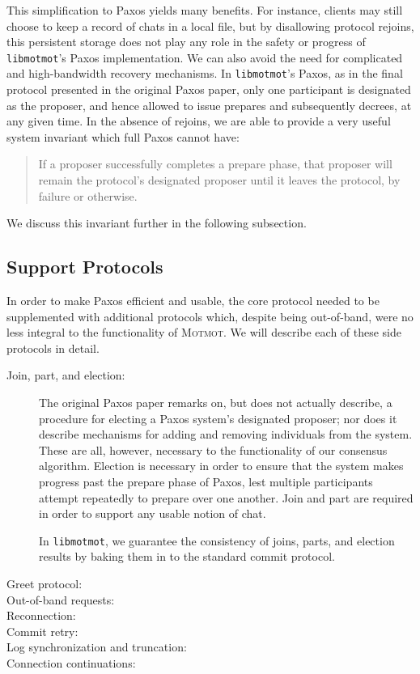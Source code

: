 \documentclass{sig-alternate}
\newcommand\Motmot{\textsc{Motmot}\xspace}
\newcommand\libmotmot{\texttt{libmotmot}\xspace}
\begin{document}
This simplification to Paxos yields many benefits.  For instance, clients may
still choose to keep a record of chats in a local file, but by disallowing
protocol rejoins, this persistent storage does not play any role in the safety
or progress of \libmotmot's Paxos implementation.  We can also avoid the need
for complicated and high-bandwidth recovery mechanisms.  In \libmotmot's Paxos,
as in the final protocol presented in the original Paxos paper, only one
participant is designated as the proposer, and hence allowed to issue prepares
and subsequently decrees, at any given time.  In the absence of rejoins, we
are able to provide a very useful system invariant which full Paxos cannot
have:
\begin{quote}
  If a proposer successfully completes a prepare phase, that proposer will
  remain the protocol's designated proposer until it leaves the protocol, by
  failure or otherwise.
\end{quote}
We discuss this invariant further in the following subsection.

\subsection{Support Protocols}

In order to make Paxos efficient and usable, the core protocol needed to be
supplemented with additional protocols which, despite being out-of-band, were
no less integral to the functionality of \Motmot.  We will describe each of
these side protocols in detail.

\begin{description}
  \item[Join, part, and election:]
    The original Paxos paper remarks on, but does not actually describe, a
    procedure for electing a Paxos system's designated proposer; nor does it
    describe mechanisms for adding and removing individuals from the system.
    These are all, however, necessary to the functionality of our consensus
    algorithm.  Election is necessary in order to ensure that the system makes
    progress past the prepare phase of Paxos, lest multiple participants
    attempt repeatedly to prepare over one another.  Join and part are required
    in order to support any usable notion of chat.

    In \libmotmot, we guarantee the consistency of joins, parts, and election
    results by baking them in to the standard commit protocol.

  \item[Greet protocol:]

  \item[Out-of-band requests:]

  \item[Reconnection:]

  \item[Commit retry:]

  \item[Log synchronization and truncation:]

  \item[Connection continuations:]
\end{description}
\end{document}
